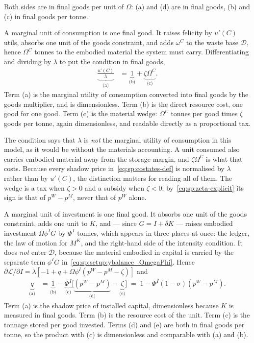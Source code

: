 Both sides are in final goods per unit of $\Omega$: (a) and (d) are in final goods, (b) and (c) in final goods per tonne.

 A marginal unit of consumption is one final good. It raises felicity by $u'\left(C\right)$ utils, absorbs one unit of the goods constraint, and adds $\omega^C$ to the waste base $\mathcal D$, hence $\Omega^C$ tonnes to the embodied material the system must carry. Differentiating and dividing by $\lambda$ to put the condition in final goods,
\begin{align}
\underbrace{\frac{u'\left(C\right)}{\lambda}}_{\text{(a)}} &= \underbrace{1}_{\text{(b)}}+\underbrace{\zeta\Omega^C}_{\text{(c)}} .
\label{eq:sp:foc:C}
\end{align}
Term (a) is the marginal utility of consumption converted into final goods by the goods multiplier, and is dimensionless. Term (b) is the direct resource cost, one good for one good. Term (c) is the material wedge: $\Omega^C$ tonnes per good times $\zeta$ goods per tonne, again dimensionless, and readable directly as a proportional tax.

The condition says that $\lambda$ is \emph{not} the marginal utility of consumption in this model, as it would be without the materials accounting. A unit consumed also carries embodied material away from the storage margin, and $\zeta\Omega^C$ is what that costs. Because every shadow price in~\eqref{eq:sp:costates-def} is normalised by $\lambda$ rather than by $u'\left(C\right)$, the distinction matters for reading all of them. The wedge is a tax when $\zeta>0$ and a subsidy when $\zeta<0$; by~\eqref{eq:sp:zeta-explicit} its sign is that of $p^W-p^M$, never that of $p^W$ alone.

 A marginal unit of investment is one final good. It absorbs one unit of the goods constraint, adds one unit to $K$, and --- since $G=I+\delta K$ --- raises embodied investment $\Omega\phi^IG$ by $\Phi^I$ tonnes, which appears in three places at once: the ledger, the law of motion for $M^K$, and the right-hand side of the intensity condition. It does \emph{not} enter $\mathcal D$, because the material embodied in capital is carried by the separate term $\phi^IG$ in~\eqref{eq:sp:setup:ybalance_OmegaPhi}. Hence $\partial\mathcal L/\partial I=\lambda\left[-1+q+\Omega\phi^I\left(p^W-p^M-\zeta\right)\right]$ and
\begin{align}
\underbrace{q}_{\text{(a)}} &= \underbrace{1}_{\text{(b)}}-\underbrace{\Phi^I}_{\text{(c)}}\Big[\underbrace{\left(p^W-p^M\right)}_{\text{(d)}}-\underbrace{\zeta}_{\text{(e)}}\Big]
\;=\;1-\Phi^I\left(1-\sigma\right)\left(p^W-p^M\right).
\label{eq:sp:foc:I}
\end{align}
Term (a) is the shadow price of installed capital, dimensionless because $K$ is measured in final goods. Term (b) is the resource cost of the unit. Term (c) is the tonnage stored per good invested. Terms (d) and (e) are both in final goods per tonne, so the product with (c) is dimensionless and comparable with (a) and (b).

